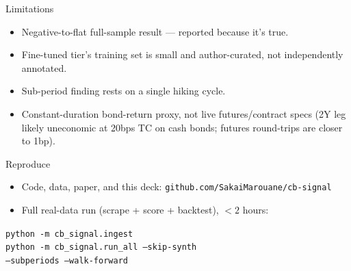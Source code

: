 \documentclass[11pt]{beamer}
\begin{document}
\begin{frame}{Limitations}
\begin{itemize}
  \item Negative-to-flat full-sample result --- reported because it's
    true.
  \item Fine-tuned tier's training set is small and author-curated, not
    independently annotated.
  \item Sub-period finding rests on a single hiking cycle.
  \item Constant-duration bond-return proxy, not live futures/contract
    specs (2Y leg likely uneconomic at 20bps TC on cash bonds; futures
    round-trips are closer to 1bp).
\end{itemize}
\end{frame}

\begin{frame}{Reproduce}
\begin{itemize}
  \item Code, data, paper, and this deck:
    \texttt{github.com/SakaiMarouane/cb-signal}
  \item Full real-data run (scrape + score + backtest), $<2$ hours:
\end{itemize}
\begin{center}
\texttt{python -m cb\_signal.ingest}\\
\texttt{python -m cb\_signal.run\_all --skip-synth}\\
\texttt{\phantom{xx}--subperiods --walk-forward}
\end{center}
\end{frame}
\end{document}
